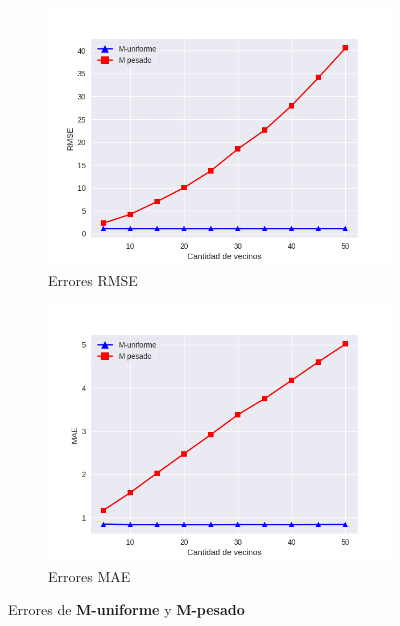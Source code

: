 \documentclass[hidelinks,12pt,a4paper]{book}
\theoremstyle{plain}
\theoremstyle{definition}
\begin{document}
\begin{figure}[ht]
\centering
    \begin{subfigure}[b]{0.5\textwidth}            
            \includegraphics[width=\textwidth]{graficos/cold-1-rmse.png}
            \caption{Errores RMSE}
    \end{subfigure}%
    \begin{subfigure}[b]{0.5\textwidth}
            \centering
            \includegraphics[width=\textwidth]{graficos/cold-1-mae.png}
            \caption{Errores MAE}
    \end{subfigure}
    \caption{Errores de \textbf{M-uniforme} y \textbf{M-pesado}}\label{fig:cold1}
\end{figure}
\end{document}
